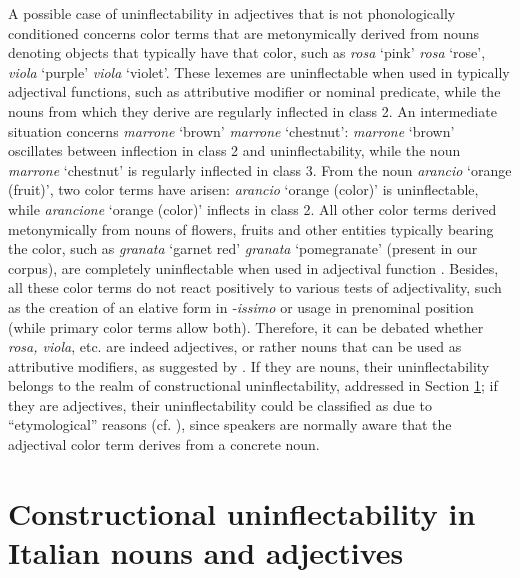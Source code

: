 \documentclass[output=paper,colorlinks,citecolor=brown]{langscibook}
\begin{document}
A possible case of uninflectability in adjectives that is not phonologically conditioned concerns color terms that are metonymically derived from nouns denoting objects that typically have that color, such as \emph{rosa} `pink' \leftarrow \emph{rosa} `rose', \emph{viola} `purple' \leftarrow \emph{viola} `violet'. These lexemes are uninflectable when used in typically adjectival functions, such as attributive modifier or nominal predicate, while the nouns from which they derive are regularly inflected in class 2. An intermediate situation concerns \emph{marrone} `brown' \leftarrow \emph{marrone} `chestnut': \emph{marrone} `brown' oscillates between inflection in class 2 and uninflectability, while the noun \emph{marrone} `chestnut' is regularly inflected in class 3. From the noun \emph{arancio} `orange (fruit)', two color terms have arisen: \emph{arancio} `orange (color)' is uninflectable, while \emph{arancione} `orange (color)' inflects in class 2. All other color terms derived metonymically from nouns of flowers, fruits and other entities typically bearing the color, such as \emph{granata} `garnet red' \leftarrow \emph{granata} `pomegranate' (present in our corpus), are completely uninflectable when used in adjectival function \citep{thornton2004}. Besides, all these color terms do not react positively to various tests of adjectivality, such as the creation of an elative form in ‑\emph{issimo} or usage in prenominal position (while primary color terms allow both). Therefore, it can be debated whether \emph{rosa, viola}, etc. are indeed adjectives, or rather nouns that can be used as attributive modifiers, as suggested by \citet[530]{thornton2004}. If they are nouns, their uninflectability belongs to the realm of constructional uninflectability, addressed in Section \ref{10sec4}; if they are adjectives, their uninflectability could be classified as due to ``etymological'' reasons (cf. \citealt{fedden2019}), since speakers are normally aware that the adjectival color term derives from a concrete noun.

\section{Constructional uninflectability in Italian nouns and adjectives} \label{10sec4}
\end{document}
